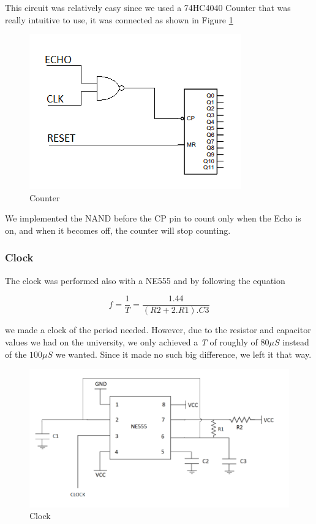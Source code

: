 This circuit was relatively easy since we used a 74HC4040 Counter
that was really intuitive to use, it was connected as shown in Figure
\ref{8_7}

\begin{figure}[H]
\begin{centering}
\includegraphics[scale=0.7]{images/COUNTER}
\par\end{centering}
\caption{Counter}
\label{8_7}

\end{figure}

We implemented the NAND before the CP pin to count only when the Echo
is on, and when it becomes off, the counter will stop counting.

\subsubsection{Clock}

The clock was performed also with a NE555 and by following the equation

\[
f=\frac{1}{T}=\frac{1.44}{(R2+2.R1).C3}
\]

we made a clock of the period needed. However, due to the resistor
and capacitor values we had on the university, we only achieved a
\emph{T} of roughly of $80\mu S$ instead of the $100\mu S$ we wanted.
Since it made no such big difference, we left it that way.

\begin{figure}[H]
\begin{centering}
\includegraphics[scale=0.5]{images/CLOCK}
\par\end{centering}
\caption{Clock}

\end{figure}

